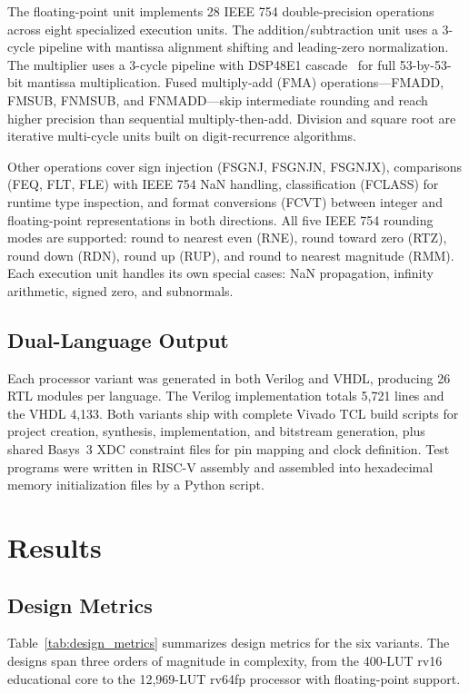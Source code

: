 \documentclass[journal]{IEEEtran}
\begin{document}
The floating-point unit implements 28 IEEE 754 double-precision operations~\cite{ieee754_2019} across eight specialized execution units. The addition/subtraction unit uses a 3-cycle pipeline with mantissa alignment shifting and leading-zero normalization. The multiplier uses a 3-cycle pipeline with DSP48E1 cascade~\cite{xilinx2020ds180} for full 53-by-53-bit mantissa multiplication. Fused multiply-add (FMA) operations---FMADD, FMSUB, FNMSUB, and FNMADD---skip intermediate rounding and reach higher precision than sequential multiply-then-add. Division and square root are iterative multi-cycle units built on digit-recurrence algorithms.

Other operations cover sign injection (FSGNJ, FSGNJN, FSGNJX), comparisons (FEQ, FLT, FLE) with IEEE 754 NaN handling, classification (FCLASS) for runtime type inspection, and format conversions (FCVT) between integer and floating-point representations in both directions. All five IEEE 754 rounding modes are supported: round to nearest even (RNE), round toward zero (RTZ), round down (RDN), round up (RUP), and round to nearest magnitude (RMM). Each execution unit handles its own special cases: NaN propagation, infinity arithmetic, signed zero, and subnormals.

\subsection{Dual-Language Output}

Each processor variant was generated in both Verilog and VHDL, producing 26 RTL modules per language. The Verilog implementation totals 5,721 lines and the VHDL 4,133. Both variants ship with complete Vivado TCL build scripts for project creation, synthesis, implementation, and bitstream generation, plus shared Basys~3 XDC constraint files for pin mapping and clock definition. Test programs were written in RISC-V assembly and assembled into hexadecimal memory initialization files by a Python script.

\section{Results}

\subsection{Design Metrics}

Table~\ref{tab:design_metrics} summarizes design metrics for the six variants. The designs span three orders of magnitude in complexity, from the 400-LUT rv16 educational core to the 12,969-LUT rv64fp processor with floating-point support.
\end{document}
